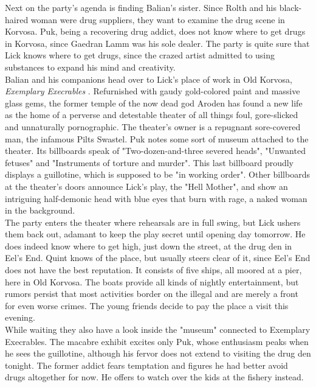 Next on the party's agenda is finding Balian's sister. Since Rolth and his black-haired woman were drug suppliers, they want to examine the drug scene in Korvosa. Puk, being a recovering drug addict, does not know where to get drugs in Korvosa, since Gaedran Lamm was his sole dealer. The party is quite sure that Lick knows where to get drugs, since the crazed artist admitted to using substances to expand his mind and creativity.\\

Balian and his companions head over to Lick's place of work in Old Korvosa, {\itshape Exemplary Execrables} . Refurnished with gaudy gold-colored paint and massive glass gems, the former temple of the now dead god Aroden has found a new life as the home of a perverse and detestable theater of all things foul, gore-slicked and unnaturally pornographic. The theater's owner is a repugnant sore-covered man, the infamous Pilts Swastel. Puk notes some sort of museum attached to the theater. Its billboards speak of "Two-dozen-and-three severed heads", "Unwanted fetuses" and "Instruments of torture and murder". This last billboard proudly displays a guillotine, which is supposed to be "in working order". Other billboards at the theater's doors announce Lick's play, the "Hell Mother", and show an intriguing half-demonic head with blue eyes that burn with rage, a naked woman in the background.\\

The party enters the theater where rehearsals are in full swing, but Lick ushers them back out, adamant to keep the play secret until opening day tomorrow. He does indeed know where to get high, just down the street, at the drug den in Eel's End. Quint knows of the place, but usually steers clear of it, since Eel's End does not have the best reputation. It consists of five ships, all moored at a pier, here in Old Korvosa. The boats provide all kinds of nightly entertainment, but rumors persist that most activities border on the illegal and are merely a front for even worse crimes. The young friends decide to pay the place a visit this evening.\\

While waiting they also have a look inside the "museum" connected to Exemplary Execrables. The macabre exhibit excites only Puk, whose enthusiasm peaks when he sees the guillotine, although his fervor does not extend to visiting the drug den tonight. The former addict fears temptation and figures he had better avoid drugs altogether for now. He offers to watch over the kids at the fishery instead.\\

